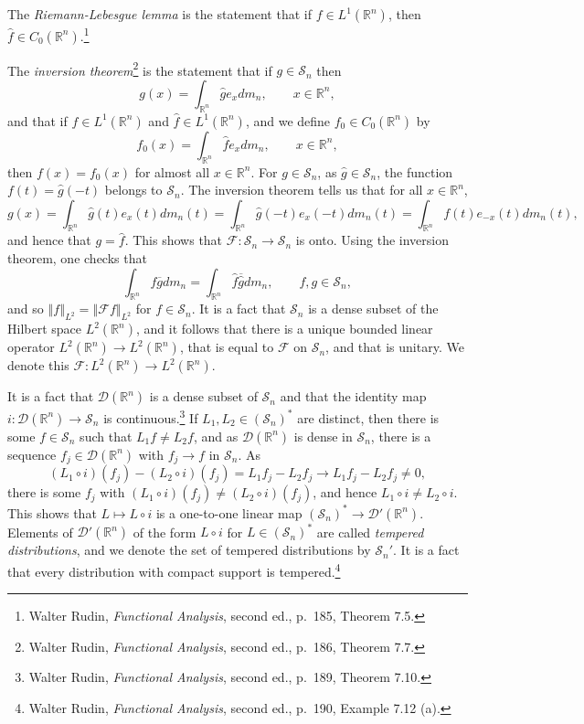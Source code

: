 \documentclass{article}
\newcommand{\norm}[1]{\left\Vert #1 \right\Vert}
\theoremstyle{definition}
\begin{document}
The {\em Riemann-Lebesgue lemma} is the statement that if $f \in L^1(\mathbb{R}^n)$, then $\hat{f} \in C_0(\mathbb{R}^n)$.\footnote{Walter
Rudin, {\em Functional Analysis}, second ed., p.~185, Theorem 7.5.}


The {\em  inversion theorem}\footnote{Walter Rudin, {\em Functional Analysis},
second ed., p.~186, Theorem 7.7.} is the statement that if
 $g \in \mathscr{S}_n$ then
\[
g(x) = \int_{\mathbb{R}^n} \hat{g}e_x dm_n, \qquad x \in \mathbb{R}^n,
\]
and that if
$f \in L^1(\mathbb{R}^n)$ and $\hat{f} \in L^1(\mathbb{R}^n)$,  and we define $f_0 \in C_0(\mathbb{R}^n)$  by 
\[
f_0(x) = \int_{\mathbb{R}^n} \hat{f} e_x dm_n, \qquad x \in \mathbb{R}^n,
\]
then $f(x)=f_0(x)$ for almost all $x \in \mathbb{R}^n$. For $g \in \mathscr{S}_n$,
as $\hat{g} \in \mathscr{S}_n$, the function
$f(t)=\hat{g}(-t)$ belongs to $\mathscr{S}_n$. The inversion theorem tells us that for all $x \in \mathbb{R}^n$,
\[
g(x) = \int_{\mathbb{R}^n} \hat{g}(t) e_x(t) dm_n(t) = \int_{\mathbb{R}^n} \hat{g}(-t) e_x(-t) dm_n(t) 
=\int_{\mathbb{R}^n} f(t) e_{-x}(t) dm_n(t),
\]
and hence that $g=\hat{f}$. 
This shows that $\mathscr{F}:\mathscr{S}_n \to \mathscr{S}_n$ is onto.
Using the inversion theorem, one checks that 
\[
\int_{\mathbb{R}^n} f\overline{g} dm_n = \int_{\mathbb{R}^n} \hat{f} \overline{\hat{g}} dm_n,
\qquad f,g \in \mathscr{S}_n,
\]
and so $\norm{f}_{L^2} = \norm{\mathscr{F}f}_{L^2}$ for $f \in \mathscr{S}_n$. It is a fact that
$\mathscr{S}_n$ is a dense subset of the Hilbert space $L^2(\mathbb{R}^n)$, and it follows that there is a unique bounded
linear operator $L^2(\mathbb{R}^n) \to L^2(\mathbb{R}^n)$, that is equal to $\mathscr{F}$ on $\mathscr{S}_n$, and that is unitary.
We denote this  $\mathscr{F}:L^2(\mathbb{R}^n) \to L^2(\mathbb{R}^n)$. 

It is a fact that $\mathscr{D}(\mathbb{R}^n)$ is a dense subset of $\mathscr{S}_n$ and that
the identity map $i:\mathscr{D}(\mathbb{R}^n) \to \mathscr{S}_n$ is continuous.\footnote{Walter Rudin, {\em Functional Analysis},
second ed., p.~189, Theorem 7.10.} If $L_1,L_2 \in (\mathscr{S}_n)^*$  are distinct, then there is some $f \in \mathscr{S}_n$ such that
$L_1 f \neq L_2 f$, and as $\mathscr{D}(\mathbb{R}^n)$ is dense in $\mathscr{S}_n$, there is a sequence $f_j \in \mathscr{D}(\mathbb{R}^n)$
with $f_j \to f$ in $\mathscr{S}_n$. As
\[
(L_1 \circ i)(f_j) - (L_2 \circ i)(f_j) =  L_1 f_j - L_2 f_j \to L_1 f_j -L_2 f_j \neq 0,
\]
there is some $f_j$ with $(L_1 \circ i)(f_j) \neq (L_2 \circ i)(f_j)$, and hence $L_1 \circ i \neq L_2 \circ i$. This shows that
$L \mapsto L \circ i$ is a one-to-one linear map $(\mathscr{S}_n)^* \to \mathscr{D}'(\mathbb{R}^n)$. 
Elements of $\mathscr{D}'(\mathbb{R}^n)$ of the form $L \circ i$ for $L \in (\mathscr{S}_n)^*$ are called
{\em tempered distributions}, and we denote the set of tempered distributions by
$\mathscr{S}_n'$.
It is a fact that every distribution with compact support is tempered.\footnote{Walter Rudin, {\em Functional Analysis}, second ed., p.~190, Example 7.12 (a).}
\end{document}
